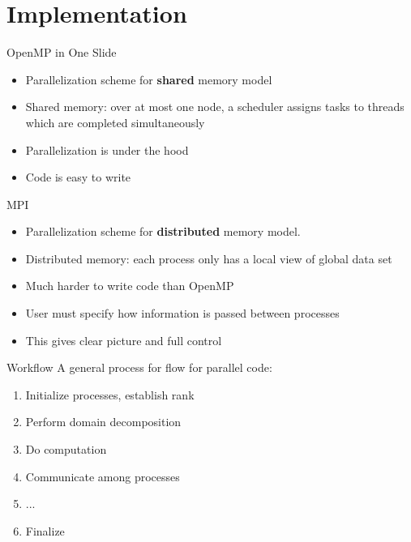 \documentclass[pdf]{beamer}
\begin{document}

\section{Implementation}

 \begin{frame}{OpenMP in One Slide}
  \begin{itemize}
	\item Parallelization scheme for \textbf{shared} memory model
	\item Shared memory: over at most one node, a scheduler assigns tasks to threads which are completed simultaneously 
	\item Parallelization is under the hood
	\item Code is easy to write
  \end{itemize}
 \end{frame}

 \begin{frame}{MPI}
  \begin{itemize}
	\item Parallelization scheme for \textbf{distributed} memory model.
	\item Distributed memory: each process only has a local view of global data set 
	\item Much harder to write code than OpenMP
	\item User must specify how information is passed between processes 
	\item This gives clear picture and full control
  \end{itemize}
 \end{frame}

 \begin{frame}{Workflow}
  A general process for flow for parallel code:
  \begin{enumerate}
	\item Initialize processes, establish rank 
	\item Perform domain decomposition
	\item Do computation
	\item Communicate among processes 
	\item ...
	\item Finalize
  \end{enumerate}
 \end{frame}
\end{document}
